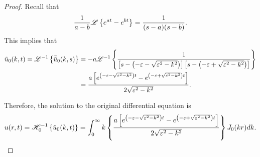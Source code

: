 \begin{proof}
  Recall that
  \begin{align*}
    \frac{1}{a-b}\mathscr{L}\left\{ {e^{at} - e^{bt}} \right\} = \frac{1}{(s-a)(s-b)}.
  \end{align*}
  This implies that
  \begin{align*}
    \tilde{u}_0(k, t) = \mathscr{L}^{-1}\left\{ {\bar{\tilde{u}}_0(k, s)} \right\} &= -a\mathscr{L}^{-1}\left\{ {\frac{1}{\left[s - \left(-\varepsilon -\sqrt{\varepsilon^2 - k^2}\right)\right]\left[s- \left(-\varepsilon +\sqrt{\varepsilon^2 - k^2}\right)\right]}} \right\} \\
    &= \frac{a\left[e^{\left(-\varepsilon -\sqrt{\varepsilon^2 - k^2}\right)t} - e^{\left(-\varepsilon +\sqrt{\varepsilon^2 - k^2}\right)t}\right]}{2\sqrt{\varepsilon^2-k^2}}.
  \end{align*}

  Therefore, the solution to the original differential equation is
  \begin{align*}
    u(r, t) = \mathscr{H}^{-1}_{ {0} }\left\{ {\tilde{u}_0(k, t)} \right\} = \int_0^\infty k \left\{\frac{a\left[e^{\left(-\varepsilon -\sqrt{\varepsilon^2 - k^2}\right)t} - e^{\left(-\varepsilon +\sqrt{\varepsilon^2 - k^2}\right)t}\right]}{2\sqrt{\varepsilon^2-k^2}} \right\}J_0(k r) dk.
  \end{align*}
\end{proof}
\newpage
